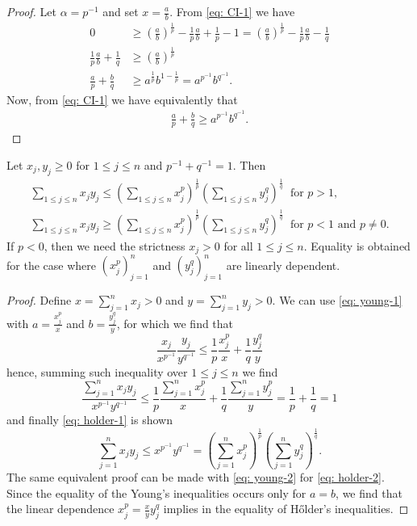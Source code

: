 \begin{proof}
  Let \(\alpha = p^{-1}\) and set \(x = \frac a b\). From \cref{eq: CI-1} we
  have
  \begin{align*}
    0 &\geq \left(\frac a b\right)^{\frac 1 p} - \frac 1 p \frac a b + \frac 1 p
    - 1 = \left(\frac a b \right)^{\frac 1 p} - \frac 1 p \frac a b - \frac 1 q
    \\
    \frac 1 p \frac a b + \frac 1 q
      &\geq \left( \frac a b \right)^{\frac 1 p}
    \\
    \frac a p + \frac b q
      &\geq a^{\frac 1 p} b^{1 - \frac 1 p} = a^{p^{-1}} b^{q^{-1}}.
  \end{align*}
  Now, from \cref{eq: CI-1} we have equivalently that
  \begin{align*}
    \frac a p + \frac b q \geq a^{p^{-1}} b^{q^{-1}}.
  \end{align*}
\end{proof}

\begin{proposition}\label{prop: holder-ineq}
  Let \(x_j, y_j \geq 0\) for \(1 \leq j \leq n\) and \(p^{-1} + q^{-1} = 1\).
  Then
  \begin{gather}
    \label{eq: holder-1}
    \sum_{1 \leq j \leq n} x_j y_j \leq \left( \sum_{1 \leq j \leq n} x_j^p
    \right)^{\frac 1 p} \left( \sum_{1 \leq j \leq n} y_j^q \right)^{\frac 1 q}\
    \text{ for } p > 1, \\
    \label{eq: holder-2}
    \sum_{1 \leq j \leq n} x_j y_j \geq \left( \sum_{1 \leq j \leq n} x_j^p
    \right)^{\frac 1 p} \left( \sum_{1 \leq j \leq n} y_j^q \right)^{\frac 1 q}\
    \text{ for } p < 1 \text{ and } p \neq 0.
  \end{gather}
  If \(p < 0\), then we need the strictness \(x_j > 0\) for all \(1 \leq j \leq
  n\). Equality is obtained for the case where \((x_j^p)_{j=1}^n\) and
  \((y_j^q)_{j=1}^n\) are linearly dependent.
\end{proposition}

\begin{proof}
  Define \(x = \sum_{j=1}^n x_j > 0\) and \(y = \sum_{j=1}^n y_j > 0\). We can
  use \cref{eq: young-1} with \(a = \frac {x_j^p} x\) and \(b = \frac {y_j^q}
  y\), for which we find that
  \[
    \frac{x_j}{x^{p^{-1}}} \frac{y_j}{y^{q^{-1}}} \leq \frac 1 p \frac{x_j^p} x
    + \frac 1 q \frac{y_j^q} y
  \]
  hence, summing such inequality over \(1 \leq j \leq n\) we find
  \[
    \frac{\sum_{j=1}^n x_j y_j}{x^{p^{-1}} y^{q^{-1}}} \leq \frac 1 p
    \frac{\sum_{j=1}^n x_j^p} x + \frac 1 q \frac{\sum_{j=1}^n y_j^p} y = \frac
    1 p + \frac 1 q = 1
  \]
  and finally \cref{eq: holder-1} is shown
  \[
    \sum_{j=1}^n x_j y_j \leq x^{p^{-1}} y^{q^{-1}}
    = \left(\sum_{j=1}^n x_j^p\right)^{\frac 1 p}
    \left(\sum_{j=1}^n y_j^q\right)^{\frac 1 q}.
  \]
  The same equivalent proof can be made with \cref{eq: young-2} for \cref{eq:
  holder-2}. Since the equality of the Young's inequalities occurs only for \(a
  = b\), we find that the linear dependence \(x_j^p = \frac x y y_j^q\) implies
  in the equality of H\H{o}lder's inequalities.
\end{proof}


